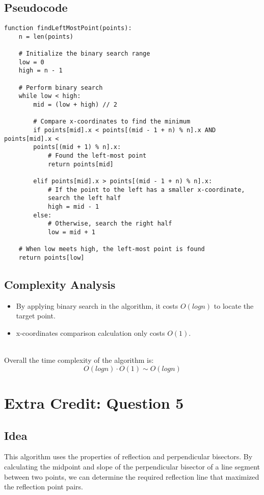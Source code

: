 \documentclass{article}
\begin{document}
\subsection*{Pseudocode}
\begin{verbatim}
function findLeftMostPoint(points):
    n = len(points)
    
    # Initialize the binary search range
    low = 0
    high = n - 1

    # Perform binary search
    while low < high:
        mid = (low + high) // 2

        # Compare x-coordinates to find the minimum
        if points[mid].x < points[(mid - 1 + n) % n].x AND points[mid].x < 
        points[(mid + 1) % n].x:
            # Found the left-most point
            return points[mid]  

        elif points[mid].x > points[(mid - 1 + n) % n].x:
            # If the point to the left has a smaller x-coordinate, 
            search the left half
            high = mid - 1
        else:
            # Otherwise, search the right half
            low = mid + 1

    # When low meets high, the left-most point is found
    return points[low]
\end{verbatim}

\subsection*{Complexity Analysis}
\begin{itemize}
    \item By applying binary search in the algorithm, it costs $O(logn)$ to locate the target point.
    \item x-coordinates comparison calculation only costs $O(1)$.
\end{itemize}
\\
Overall the time complexity of the algorithm is:
\[ O(logn) \cdot O(1) \sim O(logn) \]

\section*{Extra Credit: Question 5}

\subsection*{Idea}
This algorithm uses  the properties of reflection and perpendicular bisectors. By calculating the midpoint and slope of the perpendicular bisector of a line segment between two points, we can determine the required reflection line that maximized the reflection point pairs.
\end{document}
